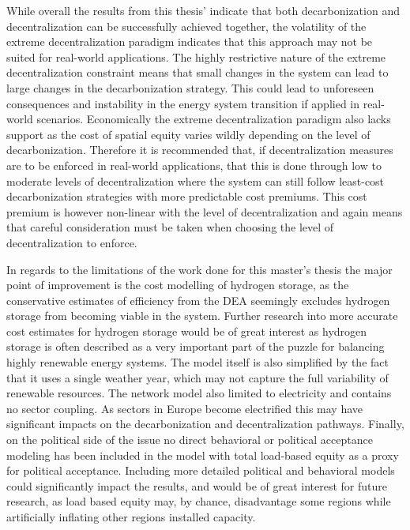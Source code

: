 \documentclass[preprint,12pt,nopreprintline]{elsarticle}
\begin{document}
\medskip
\noindent
While overall the results from this thesis' indicate that both decarbonization and decentralization can be successfully achieved together, the volatility of the extreme decentralization paradigm indicates that this approach may not be suited for real-world applications. The highly restrictive nature of the extreme decentralization constraint means that small changes in the system can lead to large changes in the decarbonization strategy. This could lead to unforeseen consequences and instability in the energy system transition if applied in real-world scenarios. Economically the extreme decentralization paradigm also lacks support as the cost of spatial equity varies wildly depending on the level of decarbonization. Therefore it is recommended that, if decentralization measures are to be enforced in real-world applications, that this is done through low to moderate levels of decentralization where the system can still follow least-cost decarbonization strategies with more predictable cost premiums. This cost premium is however non-linear with the level of decentralization and again means that careful consideration must be taken when choosing the level of decentralization to enforce.

\medskip
\noindent
In regards to the limitations of the work done for this master's thesis the major point of improvement is the cost modelling of hydrogen storage, as the conservative estimates of efficiency from the DEA seemingly excludes hydrogen storage from becoming viable in the system. Further research into more accurate cost estimates for hydrogen storage would be of great interest as hydrogen storage is often described as a very important part of the puzzle for balancing highly renewable energy systems. The model itself is also simplified by the fact that it uses a single weather year, which may not capture the full variability of renewable resources. The network model  also limited to electricity and contains no sector coupling. As sectors in Europe become electrified this may have significant impacts on the decarbonization and decentralization pathways. Finally, on the political side of the issue no direct behavioral or political acceptance modeling has been included in the model with total load-based equity as a proxy for political acceptance. Including more detailed political and behavioral models could significantly impact the results, and would be of great interest for future research, as load based equity may, by chance, disadvantage some regions while artificially inflating other regions installed capacity.
\end{document}
